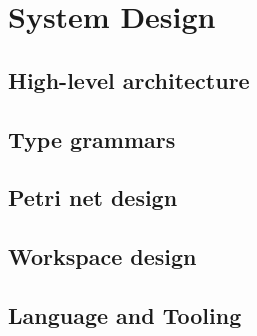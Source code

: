 \documentclass[../Dissertation.tex]{subfiles}
\begin{document}
\section{System Design}
\subsection{High-level architecture}

\subsection{Type grammars}



\subsection{Petri net design}
\subsection{Workspace design}
\subsection{Language and Tooling}
\end{document}
